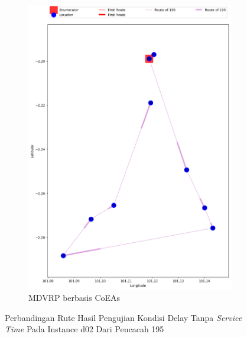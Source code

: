 \begin{figure}[H]
	\centering
	\begin{subfigure}[t]{\textwidth}
		\centering
		\includegraphics[width=\textwidth]{Resources/Images/delayed_2/real_m15_n100_delayed_2_195_coes}
		\caption{MDVRP berbasis CoEAs}
		\label{fig:real_m15_n100_delayed_2_195_coes}
	\end{subfigure}
	\caption{Perbandingan Rute Hasil Pengujian Kondisi Delay Tanpa \textit{Service Time} Pada Instance d02 Dari Pencacah 195}
	\label{fig:real_m15_n100_delayed_2_195}
\end{figure}


